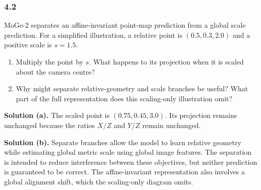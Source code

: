 \documentclass[11pt,a4paper]{article}
\begin{document}
\begin{minipage}{\linewidth}
\subsubsection*{4.2}
MoGe-2 separates an affine-invariant point-map prediction from a global scale prediction.
For a simplified illustration, a relative point is $(0.5,0.3,2.0)$ and a positive scale is $s=1.5$.
\begin{enumerate}[label=(\alph*),nosep]
\item Multiply the point by $s$.
What happens to its projection when it is scaled about the camera centre?
\item Why might separate relative-geometry and scale branches be useful?
What part of the full representation does this scaling-only illustration omit?
\end{enumerate}
\ifsolutions
\noindent\textbf{Solution (a).}
The scaled point is $(0.75,0.45,3.0)$.
Its projection remains unchanged because the ratios $X/Z$ and $Y/Z$ remain unchanged.

\noindent\textbf{Solution (b).}
Separate branches allow the model to learn relative geometry while estimating global metric scale using global image features.
The separation is intended to reduce interference between these objectives, but neither prediction is guaranteed to be correct.
The affine-invariant representation also involves a global alignment shift, which the scaling-only diagram omits.
\fi
\end{minipage}
\par\medskip
\par\noindent
\end{document}
